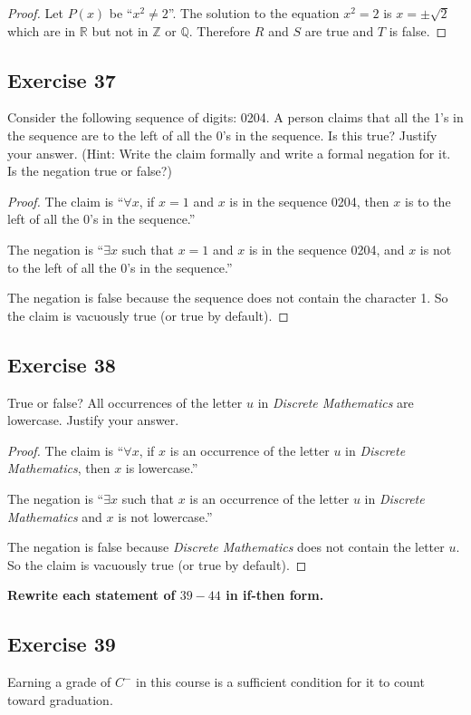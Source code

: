 \documentclass[14pt]{extarticle}
\newcommand{\R}{\mathbb{R}}
\newcommand{\Z}{\mathbb{Z}}
\newcommand{\Q}{\mathbb{Q}}
\newcommand{\fa}{\forall}
\newcommand{\te}{\exists}
\begin{document}
\begin{proof}
Let $P(x)$ be ``$x^2 \neq 2$''. The solution to the equation $x^2 = 2$ is $x = \pm \sqrt{2}$ which are in $\R$ but not in $\Z$ or $\Q$. Therefore $R$ and $S$ are true and $T$ is false.
\end{proof}

\subsection{Exercise 37}
Consider the following sequence of digits: 0204. A person claims that all the 1’s in the sequence are to the left of all the 0’s in the sequence. Is this true? Justify your answer. (Hint: Write the claim formally and write a formal negation for it. Is the negation true or false?)

\begin{proof}
The claim is “$\fa x$, if $x = 1$ and $x$ is in the sequence 0204, then $x$ is to the left of all the 0’s in the sequence.”

The negation is “$\te x$ such that $x = 1$ and $x$ is in the sequence 0204, and $x$ is not to the left of all the 0’s in the sequence.” 

The negation is false because the sequence does not contain the character 1. So the claim is vacuously true (or true by default).
\end{proof}

\subsection{Exercise 38}
True or false? All occurrences of the letter $u$ in {\it Discrete Mathematics} are lowercase. Justify your answer.

\begin{proof}
The claim is “$\fa x$, if $x$ is an occurrence of the letter $u$ in {\it Discrete Mathematics}, then $x$ is lowercase.”

The negation is “$\te x$ such that $x$ is an occurrence of the letter $u$ in {\it Discrete Mathematics} and $x$ is not lowercase.” 

The negation is false because {\it Discrete Mathematics} does not contain the letter $u$. So the claim is vacuously true (or true by default).
\end{proof}

{\bf \color{cyan} Rewrite each statement of $39-44$ in if-then form.}

\subsection{Exercise 39}
Earning a grade of $C^-$ in this course is a sufficient condition for it to count toward graduation.
\end{document}
